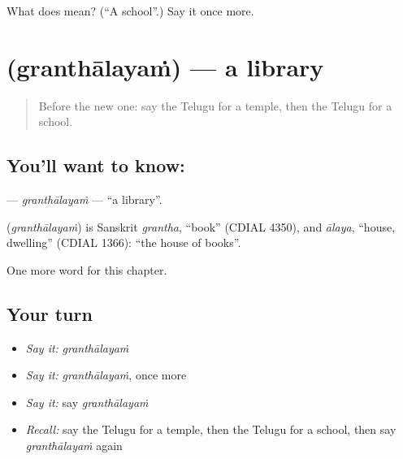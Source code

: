 \begin{tcolorbox}[breakable,colback=teal!4,colframe=teal!35!black,title={Before you move on}]
What does  mean? (\textquotedblleft{}A school\textquotedblright{}.) Say it once more.
\end{tcolorbox}
\section[\texorpdfstring{\te{గ్రంథాలయం} (granthālayaṁ)}{గ్రంథాలయం (granthālayaṁ)}]{ (granthālayaṁ) — a library}

\label{lesson:TE-C103-grandhalayam}



\begin{quote}
Before the new one: say the Telugu for a temple, then the Telugu for a school.
\end{quote}

\subsection*{You'll want to know: }
\textbf{} — \emph{granthālayaṁ} — \textquotedblleft{}a library\textquotedblright{}.

\begin{cousinweb}
\textbf{} (\emph{granthālayaṁ}) is Sanskrit \emph{grantha}, \textquotedblleft{}book\textquotedblright{} (CDIAL 4350), and \emph{ālaya}, \textquotedblleft{}house, dwelling\textquotedblright{} (CDIAL 1366): \textquotedblleft{}the house of books\textquotedblright{}.
\end{cousinweb}

\begin{grammarlens}[title={What you've built}]
One more word for this chapter.
\end{grammarlens}

\subsection*{Your turn}
\begin{itemize}
\raggedright
  \item \emph{Say it:} \emph{granthālayaṁ}
  \item \emph{Say it:} \emph{granthālayaṁ}, once more
  \item \emph{Say it:} say \emph{granthālayaṁ}
  \item \emph{Recall:} say the Telugu for a temple, then the Telugu for a school, then say \emph{granthālayaṁ} again
\end{itemize}

